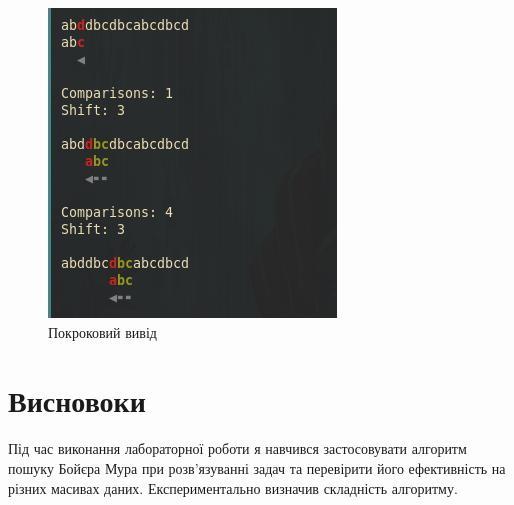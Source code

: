 \documentclass{article}
\begin{document}
\begin{normalsize}
		\begin{figure}[H]
			\centering
			\includegraphics[scale=0.7]{2}
			\caption{Покроковий вивід}
		\end{figure}
		
		\section*{Висновоки}
		Під час виконання лабораторної роботи я навчився застосовувати алгоритм пошуку Бойєра Мура при розв’язуванні задач та перевірити його ефективність на різних масивах даних. Експериментально визначив складність алгоритму. 
		
	\end{normalsize}
\end{document}
